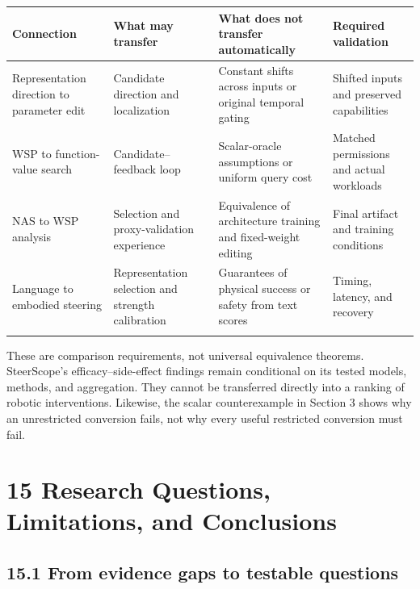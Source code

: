 \begin{longtable}{>{\raggedright\arraybackslash}p{3.53cm}>{\raggedright\arraybackslash}p{3.53cm}>{\raggedright\arraybackslash}p{3.53cm}>{\raggedright\arraybackslash}p{3.53cm}}

\toprule

\textbf{Connection} & \textbf{What may transfer} & \textbf{What does not transfer automatically} & \textbf{Required validation}\\\midrule\endhead

Representation direction to parameter edit & Candidate direction and localization & Constant shifts across inputs or original temporal gating & Shifted inputs and preserved capabilities\\\addlinespace[3pt]

WSP to function-value search & Candidate–feedback loop & Scalar-oracle assumptions or uniform query cost & Matched permissions and actual workloads\\\addlinespace[3pt]

NAS to WSP analysis & Selection and proxy-validation experience & Equivalence of architecture training and fixed-weight editing & Final artifact and training conditions\\\addlinespace[3pt]

Language to embodied steering & Representation selection and strength calibration & Guarantees of physical success or safety from text scores & Timing, latency, and recovery\\\addlinespace[3pt]

\bottomrule\end{longtable}\endgroup

These are comparison requirements, not universal equivalence theorems. SteerScope's efficacy–side-effect findings remain conditional on its tested models, methods, and aggregation.\cite{r87} They cannot be transferred directly into a ranking of robotic interventions. Likewise, the scalar counterexample in Section 3 shows why an unrestricted conversion fails, not why every useful restricted conversion must fail.


\section*{15 Research Questions, Limitations, and Conclusions}

\subsection*{15.1 From evidence gaps to testable questions}

